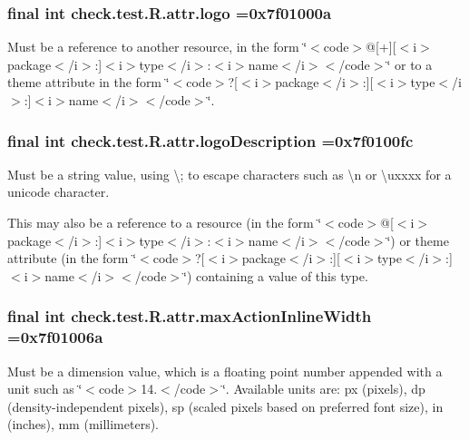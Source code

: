 \subsubsection[{logo}]{\setlength{\rightskip}{0pt plus 5cm}final int check.\+test.\+R.\+attr.\+logo =0x7f01000a\hspace{0.3cm}{\ttfamily [static]}}\label{classcheck_1_1test_1_1_r_1_1attr_a88dc33a575e7d1ce7a25603825bb87c0}
Must be a reference to another resource, in the form \char`\"{}$<$code$>$@\mbox{[}+\mbox{]}\mbox{[}$<$i$>$package$<$/i$>$\+:\mbox{]}$<$i$>$type$<$/i$>$\+:$<$i$>$name$<$/i$>$$<$/code$>$\char`\"{} or to a theme attribute in the form \char`\"{}$<$code$>$?\mbox{[}$<$i$>$package$<$/i$>$\+:\mbox{]}\mbox{[}$<$i$>$type$<$/i$>$\+:\mbox{]}$<$i$>$name$<$/i$>$$<$/code$>$\char`\"{}. \hypertarget{classcheck_1_1test_1_1_r_1_1attr_a8ef51fc670409d939be8dfc4555f3d68}{}
\subsubsection[{logo\+Description}]{\setlength{\rightskip}{0pt plus 5cm}final int check.\+test.\+R.\+attr.\+logo\+Description =0x7f0100fc\hspace{0.3cm}{\ttfamily [static]}}\label{classcheck_1_1test_1_1_r_1_1attr_a8ef51fc670409d939be8dfc4555f3d68}
Must be a string value, using \textquotesingle{}\textbackslash{};\textquotesingle{} to escape characters such as \textquotesingle{}\textbackslash{}n\textquotesingle{} or \textquotesingle{}\textbackslash{}uxxxx\textquotesingle{} for a unicode character. 

This may also be a reference to a resource (in the form \char`\"{}$<$code$>$@\mbox{[}$<$i$>$package$<$/i$>$\+:\mbox{]}$<$i$>$type$<$/i$>$\+:$<$i$>$name$<$/i$>$$<$/code$>$\char`\"{}) or theme attribute (in the form \char`\"{}$<$code$>$?\mbox{[}$<$i$>$package$<$/i$>$\+:\mbox{]}\mbox{[}$<$i$>$type$<$/i$>$\+:\mbox{]}$<$i$>$name$<$/i$>$$<$/code$>$\char`\"{}) containing a value of this type. \hypertarget{classcheck_1_1test_1_1_r_1_1attr_aaf48db98a44dd24bf15a4986a845fa97}{}
\subsubsection[{max\+Action\+Inline\+Width}]{\setlength{\rightskip}{0pt plus 5cm}final int check.\+test.\+R.\+attr.\+max\+Action\+Inline\+Width =0x7f01006a\hspace{0.3cm}{\ttfamily [static]}}\label{classcheck_1_1test_1_1_r_1_1attr_aaf48db98a44dd24bf15a4986a845fa97}
Must be a dimension value, which is a floating point number appended with a unit such as \char`\"{}$<$code$>$14.\+5sp$<$/code$>$\char`\"{}. Available units are\+: px (pixels), dp (density-\/independent pixels), sp (scaled pixels based on preferred font size), in (inches), mm (millimeters). 

